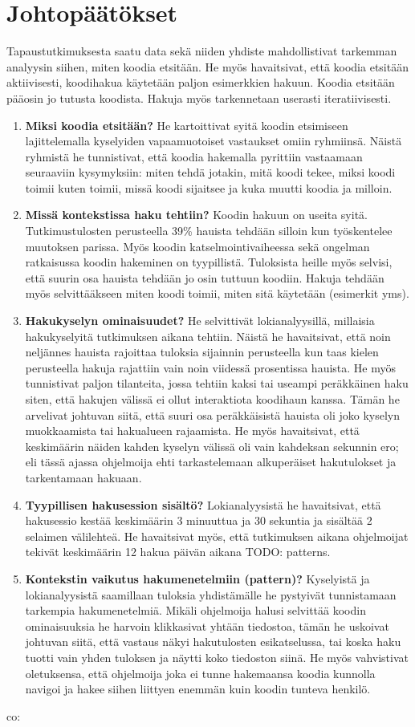 \documentclass[finnish]{../tktltiki2}
\theoremstyle{definition}
\theoremstyle{remark}
\begin{document}
\section{Johtopäätökset}
Tapaustutkimuksesta saatu data sekä niiden yhdiste mahdollistivat tarkemman analyysin siihen, miten koodia etsitään. He myös havaitsivat, että koodia etsitään aktiivisesti, koodihakua käytetään paljon esimerkkien hakuun. Koodia etsitään pääosin jo tutusta koodista. Hakuja myös tarkennetaan userasti iteratiivisesti.
\begin{enumerate}
  \item {\bf Miksi koodia etsitään?}
    He kartoittivat syitä koodin etsimiseen lajittelemalla kyselyiden vapaamuotoiset vastaukset omiin ryhmiinsä. Näistä ryhmistä he tunnistivat, että koodia hakemalla pyrittiin vastaamaan seuraaviin kysymyksiin: miten tehdä jotakin, mitä koodi tekee, miksi koodi toimii kuten toimii, missä koodi sijaitsee ja kuka muutti koodia ja milloin.
  \item {\bf Missä kontekstissa haku tehtiin?}
    Koodin hakuun on useita syitä. Tutkimustulosten perusteella 39\% hauista tehdään silloin kun työskentelee muutoksen parissa. Myös koodin katselmointivaiheessa sekä ongelman ratkaisussa koodin hakeminen on tyypillistä. Tuloksista heille myös selvisi, että suurin osa hauista tehdään jo osin tuttuun koodiin. Hakuja tehdään myös selvittääkseen miten koodi toimii, miten sitä käytetään (esimerkit yms).
  \item {\bf Hakukyselyn ominaisuudet?}
    He selvittivät lokianalyysillä, millaisia hakukyselyitä tutkimuksen aikana tehtiin. Näistä he havaitsivat, että noin neljännes hauista rajoittaa tuloksia sijainnin perusteella kun taas kielen perusteella hakuja rajattiin vain noin viidessä prosentissa hauista.
    He myös tunnistivat paljon tilanteita, jossa tehtiin kaksi tai useampi peräkkäinen haku siten, että hakujen välissä ei ollut interaktiota koodihaun kanssa. Tämän he arvelivat johtuvan siitä, että suuri osa peräkkäisistä hauista oli joko kyselyn muokkaamista tai hakualueen rajaamista. He myös havaitsivat, että keskimäärin näiden kahden kyselyn välissä oli vain kahdeksan sekunnin ero; eli tässä ajassa ohjelmoija ehti tarkastelemaan alkuperäiset hakutulokset ja tarkentamaan hakuaan.
  \item {\bf Tyypillisen hakusession sisältö?}
    Lokianalyysistä he havaitsivat, että hakusessio kestää keskimäärin 3 minuuttua ja 30 sekuntia ja sisältää 2 selaimen välilehteä. He havaitsivat myös, että tutkimuksen aikana ohjelmoijat tekivät keskimäärin 12 hakua päivän aikana
    TODO: patterns.
  \item {\bf Kontekstin vaikutus hakumenetelmiin (pattern)?}
    Kyselyistä ja lokianalyysistä saamillaan tuloksia yhdistämälle he pystyivät tunnistamaan tarkempia hakumenetelmiä. Mikäli ohjelmoija halusi selvittää koodin ominaisuuksia he harvoin klikkasivat yhtään tiedostoa, tämän he uskoivat johtuvan siitä, että vastaus näkyi hakutulosten esikatselussa, tai koska haku tuotti vain yhden tuloksen ja näytti koko tiedoston siinä. He myös vahvistivat oletuksensa, että ohjelmoija joka ei tunne hakemaansa koodia kunnolla navigoi ja hakee siihen liittyen enemmän kuin koodin tunteva henkilö.

\end{enumerate}
co:
\end{document}
